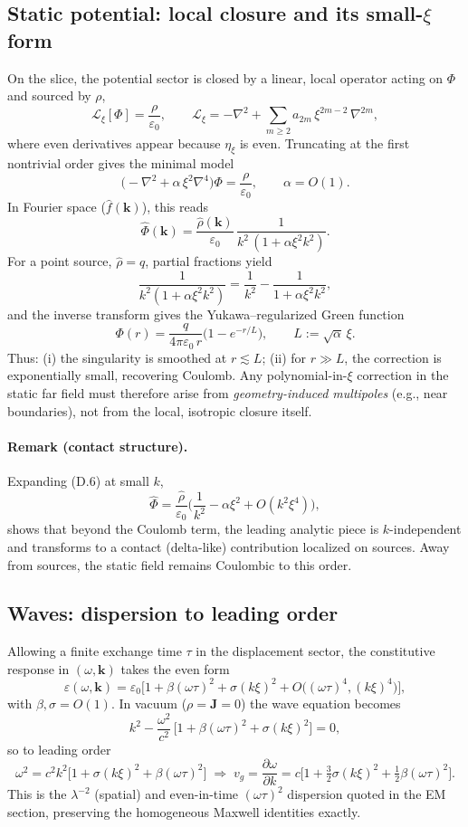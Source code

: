 \subsection{Static potential: local closure and its small-$\xi$ form}
On the slice, the potential sector is closed by a linear, local operator acting on $\Phi$ and sourced by $\rho$,
\[
\mathcal{L}_\xi[\Phi]=\frac{\rho}{\varepsilon_0},\qquad
\mathcal{L}_\xi=-\nabla^2+\sum_{m\ge 2} a_{2m}\,\xi^{2m-2}\,\nabla^{2m},\tag{D.4}
\]
where even derivatives appear because $\eta_\xi$ is even. Truncating at the first nontrivial order gives the minimal model
\[
\big(-\nabla^2+\alpha\,\xi^2\nabla^4\big)\Phi=\frac{\rho}{\varepsilon_0},\qquad \alpha=O(1).\tag{D.5}
\]
In Fourier space ($\hat f(\mathbf k)$), this reads
\[
\hat\Phi(\mathbf k)=\frac{\hat\rho(\mathbf k)}{\varepsilon_0}\,\frac{1}{k^2\,(1+\alpha\xi^2 k^2)}.\tag{D.6}
\]
For a point source, $\hat\rho=q$, partial fractions yield
\[
\frac{1}{k^2(1+\alpha\xi^2 k^2)}=\frac{1}{k^2}-\frac{1}{1+\alpha\xi^2 k^2},\tag{D.7}
\]
and the inverse transform gives the Yukawa–regularized Green function
\[
\Phi(r)=\frac{q}{4\pi\varepsilon_0\,r}\Big(1-e^{-r/L}\Big),\qquad L:=\sqrt{\alpha}\,\xi.\tag{D.8}
\]
Thus: (i) the singularity is smoothed at $r\!\lesssim\!L$; (ii) for $r\!\gg\!L$, the correction is exponentially small, recovering Coulomb. Any polynomial-in-$\xi$ correction in the static far field must therefore arise from \emph{geometry-induced multipoles} (e.g., near boundaries), not from the local, isotropic closure itself.

\paragraph*{Remark (contact structure).} Expanding (D.6) at small $k$,
\[
\hat\Phi=\frac{\hat\rho}{\varepsilon_0}\Big(\frac{1}{k^2}-\alpha\xi^2+O(k^2\xi^4)\Big),\tag{D.9}
\]
shows that beyond the Coulomb term, the leading analytic piece is $k$-independent and transforms to a contact (delta-like) contribution localized on sources. Away from sources, the static field remains Coulombic to this order.

\subsection{Waves: dispersion to leading order}
Allowing a finite exchange time $\tau$ in the displacement sector, the constitutive response in $(\omega,\mathbf k)$ takes the even form
\[
\varepsilon(\omega,\mathbf k)=\varepsilon_0\Big[1+\beta(\omega\tau)^2+\sigma (k\xi)^2+O\big((\omega\tau)^4,(k\xi)^4\big)\Big],\tag{D.10}
\]
with $\beta,\sigma=O(1)$. In vacuum ($\rho=\mathbf J=0$) the wave equation becomes
\[
k^2-\frac{\omega^2}{c^2}\,\Big[1+\beta(\omega\tau)^2+\sigma (k\xi)^2\Big]=0,\tag{D.11}
\]
so to leading order
\[
\omega^2=c^2 k^2\Big[1+\sigma (k\xi)^2+\beta (\omega\tau)^2\Big]
\;\Rightarrow\;
v_g=\frac{\partial\omega}{\partial k}=c\Big[1+\tfrac{3}{2}\sigma (k\xi)^2+\tfrac{1}{2}\beta (\omega\tau)^2\Big].\tag{D.12}
\]
This is the $\lambda^{-2}$ (spatial) and even-in-time $(\omega\tau)^2$ dispersion quoted in the EM section, preserving the homogeneous Maxwell identities exactly.

